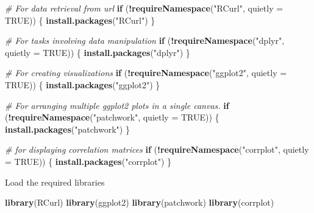 \documentclass[
]{article}
\newenvironment{Shaded}{\begin{snugshade}}{\end{snugshade}}
\newcommand{\AttributeTok}[1]{\textcolor[rgb]{0.13,0.29,0.53}{#1}}
\newcommand{\CommentTok}[1]{\textcolor[rgb]{0.56,0.35,0.01}{\textit{#1}}}
\newcommand{\ConstantTok}[1]{\textcolor[rgb]{0.56,0.35,0.01}{#1}}
\newcommand{\ControlFlowTok}[1]{\textcolor[rgb]{0.13,0.29,0.53}{\textbf{#1}}}
\newcommand{\FunctionTok}[1]{\textcolor[rgb]{0.13,0.29,0.53}{\textbf{#1}}}
\newcommand{\NormalTok}[1]{#1}
\newcommand{\SpecialCharTok}[1]{\textcolor[rgb]{0.81,0.36,0.00}{\textbf{#1}}}
\newcommand{\StringTok}[1]{\textcolor[rgb]{0.31,0.60,0.02}{#1}}
\begin{document}
\begin{Shaded}
\begin{Highlighting}[]
\CommentTok{\# For data retrieval from url}
\ControlFlowTok{if}\NormalTok{ (}\SpecialCharTok{!}\FunctionTok{requireNamespace}\NormalTok{(}\StringTok{"RCurl"}\NormalTok{, }\AttributeTok{quietly =} \ConstantTok{TRUE}\NormalTok{)) \{}
  \FunctionTok{install.packages}\NormalTok{(}\StringTok{"RCurl"}\NormalTok{)}
\NormalTok{\}}

\CommentTok{\# For tasks involving data manipulation}
\ControlFlowTok{if}\NormalTok{ (}\SpecialCharTok{!}\FunctionTok{requireNamespace}\NormalTok{(}\StringTok{"dplyr"}\NormalTok{, }\AttributeTok{quietly =} \ConstantTok{TRUE}\NormalTok{)) \{}
  \FunctionTok{install.packages}\NormalTok{(}\StringTok{"dplyr"}\NormalTok{)}
\NormalTok{\}}

\CommentTok{\# For creating visualizations}
\ControlFlowTok{if}\NormalTok{ (}\SpecialCharTok{!}\FunctionTok{requireNamespace}\NormalTok{(}\StringTok{"ggplot2"}\NormalTok{, }\AttributeTok{quietly =} \ConstantTok{TRUE}\NormalTok{)) \{}
  \FunctionTok{install.packages}\NormalTok{(}\StringTok{"ggplot2"}\NormalTok{)}
\NormalTok{\}}

\CommentTok{\# For arranging multiple ggplot2 plots in a single canvas.}
\ControlFlowTok{if}\NormalTok{ (}\SpecialCharTok{!}\FunctionTok{requireNamespace}\NormalTok{(}\StringTok{"patchwork"}\NormalTok{, }\AttributeTok{quietly =} \ConstantTok{TRUE}\NormalTok{)) \{}
  \FunctionTok{install.packages}\NormalTok{(}\StringTok{"patchwork"}\NormalTok{)}
\NormalTok{\}}

\CommentTok{\# for displaying correlation matrices}
\ControlFlowTok{if}\NormalTok{ (}\SpecialCharTok{!}\FunctionTok{requireNamespace}\NormalTok{(}\StringTok{"corrplot"}\NormalTok{, }\AttributeTok{quietly =} \ConstantTok{TRUE}\NormalTok{)) \{}
  \FunctionTok{install.packages}\NormalTok{(}\StringTok{"corrplot"}\NormalTok{)}
\NormalTok{\}}
\end{Highlighting}
\end{Shaded}

Load the required libraries

\begin{Shaded}
\begin{Highlighting}[]
\FunctionTok{library}\NormalTok{(RCurl)}
\FunctionTok{library}\NormalTok{(ggplot2)}
\FunctionTok{library}\NormalTok{(patchwork)}
\FunctionTok{library}\NormalTok{(corrplot)}
\end{Highlighting}
\end{Shaded}
\end{document}
